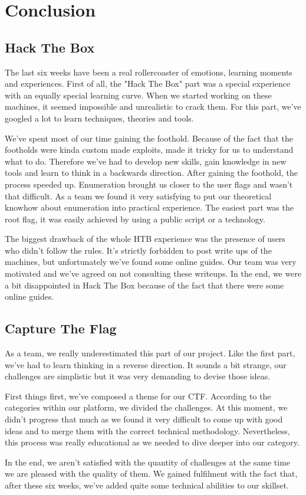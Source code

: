 \documentclass[../main.tex]{subfiles}
\begin{document}
\section{Conclusion}

\subsection{Hack The Box}

The last six weeks have been a real rollercoaster of emotions, learning moments and experiences. First of all, the "Hack The Box" part was a special experience with an equally special learning curve. When we started working on these machines, it seemed impossible and unrealistic to crack them. For this part, we've googled a lot to learn techniques, theories and tools. 

We've spent most of our time gaining the foothold. Because of the fact that the footholds were kinda custom made exploits, made it tricky for us to understand what to do. Therefore we've had to develop new skills, gain knowledge in new tools and learn to think in a backwards direction. After gaining the foothold, the process speeded up. Enumeration brought us closer to the user flags and wasn't that difficult. As a team we found it very satisfying to put our theoretical knowhow about enumeration into practical experience. The easiest part was the root flag, it was easily achieved by using a public script or a technology. 

The biggest drawback of the whole HTB experience was the presence of users who didn't follow the rules. It's strictly forbidden to post write ups of the machines, but unfortunately we've found some online guides. Our team was very motivated and we've agreed on not consulting these writeups. In the end, we were a bit disappointed in Hack The Box because of the fact that there were some online guides.

\subsection{Capture The Flag}

As a team, we really underestimated this part of our project. Like the first part, we've had to learn thinking in a reverse direction. It sounds a bit strange, our challenges are simplistic but it was very demanding to devise those ideas. 

First things first, we've composed a theme for our CTF. According to the categories within our platform, we divided the challenges. At this moment, we didn't progress that much as we found it very difficult to come up with good ideas and to merge them with the correct technical methodology. Nevertheless, this process was really educational as we needed to dive deeper into our category.


In the end, we aren't satisfied with the quantity of challenges at the same time we are pleased with the quality of them. We gained fulfilment with the fact that, after these six weeks, we've added quite some technical abilities to our skillset.
\end{document}
